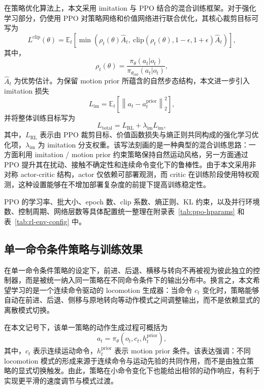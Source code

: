 在策略优化算法上，本文采用 imitation 与 PPO 结合的混合训练框架。对于强化学习部分，仍使用 PPO 对策略网络和价值网络进行联合优化，其核心裁剪目标可写为
\begin{equation}
L^{\text{clip}}(\theta) =
\mathbb{E}_t\left[
\min\!\left(
\rho_t(\theta)\hat{A}_t,\ 
\text{clip}\!\left(\rho_t(\theta), 1-\epsilon, 1+\epsilon\right)\hat{A}_t
\right)
\right],
\end{equation}
其中，
\begin{equation}
\rho_t(\theta) = \frac{\pi_{\theta}(a_t|o_t)}{\pi_{\theta_{\text{old}}}(a_t|o_t)},
\end{equation}
$\hat{A}_t$ 为优势估计。为保留 motion prior 所蕴含的自然步态结构，本文进一步引入 imitation 损失
\begin{equation}
L_{\mathrm{im}} = \mathbb{E}_t \left[\left\| a_t - a_t^{\mathrm{prior}} \right\|_2^2\right],
\end{equation}
并将整体训练目标写为
\begin{equation}
L_{\mathrm{total}} = L_{\mathrm{RL}} + \lambda_{\mathrm{im}} L_{\mathrm{im}},
\end{equation}
其中，$L_{\mathrm{RL}}$ 表示由 PPO 裁剪目标、价值函数损失与熵正则共同构成的强化学习优化项，$\lambda_{\mathrm{im}}$ 为 imitation 分支权重。该写法刻画的是一种典型的混合训练思路：一方面利用 imitation / motion prior 约束策略保持自然运动风格，另一方面通过 PPO 提升其在扰动、接触不确定性和连续命令变化下的鲁棒性。由于本文采用非对称 actor-critic 结构，actor 仅依赖可部署观测，而 critic 在训练阶段使用特权观测，这种设置能够在不增加部署复杂度的前提下提高训练稳定性。

PPO 的学习率、批大小、epoch 数、clip 系数、熵正则、KL 约束，以及并行环境数、控制周期、网络层数等具体配置统一整理在附录表~\ref{tab:ppo-hparams} 
和表~\ref{tab:rl-env-config} 中。

\subsection{单一命令条件策略与训练效果}

在单一命令条件策略的设定下，前进、后退、横移与转向不再被视为彼此独立的控制器，而是被统一纳入同一策略在不同命令条件下的输出分布中。换言之，本文希望学习的是一个连续命令驱动的 locomotion 生成器：当命令 $c_t$ 变化时，策略能够自动在前进、后退、侧移与原地转向等动作模式之间调整输出，而不是依赖显式的离散模式切换。

在本文记号下，该单一策略的动作生成过程可概括为
\begin{equation}
a_t = \pi_{\theta}(o_t, c_t, h_t^{\mathrm{prior}}),
\end{equation}
其中，$c_t$ 表示连续运动命令，$h_t^{\mathrm{prior}}$ 表示 motion prior 条件。该表达强调：不同 locomotion 模式的形成来源于连续命令与运动先验的共同作用，而不是由独立策略的显式切换触发。由此，策略在小命令变化下也能给出相邻的动作响应，有利于实现更平滑的速度调节与模式过渡。

